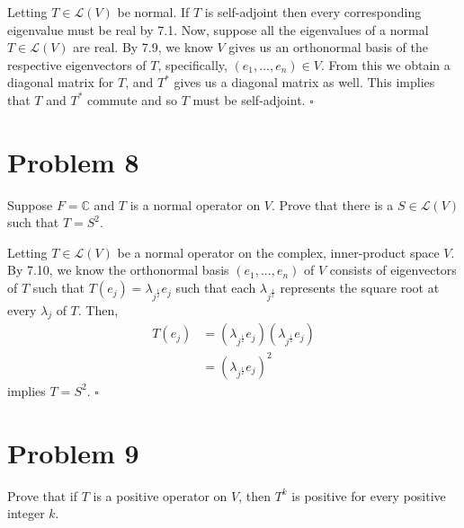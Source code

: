 \documentclass[12pt]{article}
\newcommand{\C}{\mathbb{C}}
\newenvironment{proof}{\noindent{\bf Proof.}}{\hfill $\square$\medskip}
\begin{document}
\begin{proof}
Letting $T\in\mathcal{L}(V)$ be normal. If $T$ is self-adjoint then every corresponding eigenvalue must be real by 7.1. Now, suppose all the eigenvalues of a normal $T\in\mathcal{L}(V)$ are real. By 7.9, we know $V$ gives us an orthonormal basis of the respective eigenvectors of $T$, specifically, $(e_{1},...,e_{n})\in V$. From this we obtain a diagonal matrix for $T$, and $T^{*}$ gives us a diagonal matrix as well. This implies that $T$ and $T^{*}$ commute and so $T$ must be self-adjoint.
\end{proof}


\section{Problem 8}
Suppose $F=\C$ and $T$ is a normal operator on $V$. Prove that there is a $S\in\mathcal{L}(V)$ such that $T=S^{2}$.

\begin{proof}
Letting $T\in\mathcal{L}(V)$ be a normal operator on the complex, inner-product space $V$. By 7.10, we know the orthonormal basis $(e_{1},...,e_{n})$ of $V$ consists of eigenvectors of $T$ such that $T(e_{j})=\lambda_{j^{\frac{1}{2}}}e_{j}$ such that each $\lambda_{j^{\frac{1}{2}}}$ represents the square root at every $\lambda_{j}$ of $T$. Then,
\begin{equation}
\begin{split}
T(e_{j})&=(\lambda_{j^{\frac{1}{2}}}e_{j})(\lambda_{j^{\frac{1}{2}}}e_{j})\\
&=(\lambda_{j^{\frac{1}{2}}}e_{j})^{2}
\end{split}
\end{equation}
implies $T=S^{2}$.
\end{proof}


\newpage
\section{Problem 9}
Prove that if $T$ is a positive operator on $V$, then $T^{k}$ is positive for every positive integer $k$.
\end{document}
